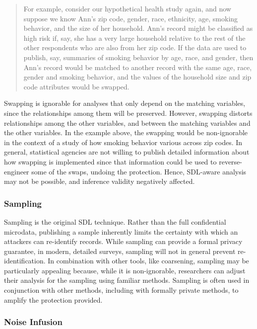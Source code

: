 \documentclass[
]{WileySix}
\begin{document}
\begin{quote}
For example, consider our hypothetical health study again, and now suppose we know Ann's zip code, gender, race, ethnicity, age, smoking behavior, and the size of her household. Ann's record might be classified as high risk if, say, she has a very large household relative to the rest of the other respondents who are also from her zip code. If the data are used to publish, say, summaries of smoking behavior by age, race, and gender, then Ann's record would be matched to another record with the same age, race, gender and smoking behavior, and the values of the household size and zip code attributes would be swapped.
\end{quote}

Swapping is ignorable for analyses that only depend on the matching variables, since the relationships among them will be preserved. However, swapping distorts relationships among the other variables, and between the matching variables and the other variables. In the example above, the swapping would be non-ignorable in the context of a study of how smoking behavior various across zip codes. In general, statistical agencies are not willing to publish detailed information about how swapping is implemented since that information could be used to reverse-engineer some of the swaps, undoing the protection. Hence, SDL-aware analysis may not be possible, and inference validity negatively affected.

\hypertarget{sampling}{%
\subsubsection{Sampling}\label{sampling}}

Sampling is the original SDL technique. Rather than the full confidential microdata, publishing a sample inherently limits the certainty with which an attackers can re-identify records.
While sampling can provide a formal privacy guarantee, in modern, detailed surveys, sampling will not in general prevent re-identification. In combination with other tools, like coarsening, sampling may be particularly appealing because, while it is non-ignorable, researchers can adjust their analysis for the sampling using familiar methods. Sampling is often used in conjunction with other methods, including with formally private methods, to amplify the protection provided.

\hypertarget{noise-infusion}{%
\subsubsection{Noise Infusion}\label{noise-infusion}}
\end{document}
